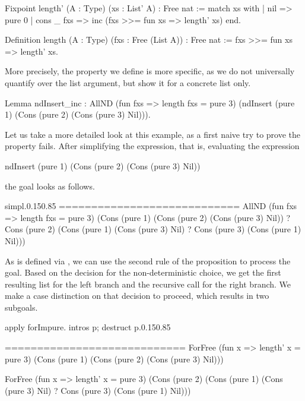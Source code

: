 \begin{coqcode}
Fixpoint length' (A : Type) (xs : List' A) : Free nat :=
  match xs with
  | nil        => pure 0
  | cons _ fxs => inc (fxs >>= fun xs => length' xs)
  end.

Definition length (A : Type) (fxs : Free (List A)) : Free nat :=
  fxs >>= fun xs => length' xs.
\end{coqcode}
  
More precisely, the property we define is more specific, as we do not universally quantify over the list argument, but show it for a concrete list only.

\begin{coqcode}
Lemma ndInsert_inc :
  AllND (fun fxs => length fxs = pure 3)
        (ndInsert (pure 1) (Cons (pure 2) (Cons (pure 3) Nil))).
\end{coqcode}

Let us take a more detailed look at this example, as a first naive try to prove the property fails.
After simplifying the expression, that is, evaluating the expression
\begin{coqcode}
  ndInsert (pure 1) (Cons (pure 2) (Cons (pure 3) Nil))
\end{coqcode}
the goal looks as follows.

\begin{cproof1}{simpl.}{0.15}{0.85}
  ============================
  AllND (fun fxs => length fxs = pure 3)
        (Cons (pure 1) (Cons (pure 2) (Cons (pure 3) Nil))
        ? Cons (pure 2) (Cons (pure 1) (Cons (pure 3) Nil)
                        ? Cons (pure 3) (Cons (pure 1) Nil)))
\end{cproof1}

As  is defined via , we can use the second rule of the proposition to process the goal.
Based on the decision for the non\--deterministic choice, we get the first resulting list for the left branch and the recursive call for the right branch.
We make a case distinction on that decision to proceed, which results in two subgoals.

\begin{cproof1}{apply forImpure. intros p; destruct p.}{0.15}{0.85}

  ============================
  ForFree (fun x => length' x = pure 3)
          (Cons (pure 1) (Cons (pure 2) (Cons (pure 3) Nil)))

  ForFree (fun x => length' x = pure 3)
          (Cons (pure 2) (Cons (pure 1) (Cons (pure 3) Nil)
                         ? Cons (pure 3) (Cons (pure 1) Nil)))
\end{cproof1}


